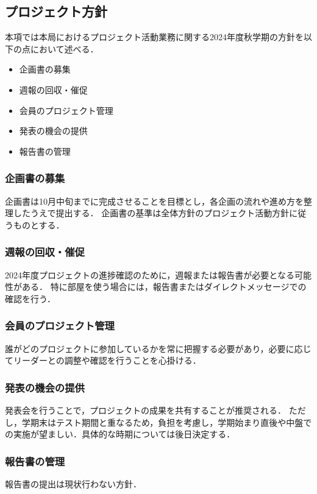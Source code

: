\subsection*{プロジェクト方針}


本項では本局におけるプロジェクト活動業務に関する2024年度秋学期の方針を以下の点において述べる．

\begin{itemize}
  \item 企画書の募集
  \item 週報の回収・催促
  \item 会員のプロジェクト管理
  \item 発表の機会の提供
  \item 報告書の管理
\end{itemize}

\subsubsection*{企画書の募集}

企画書は10月中旬までに完成させることを目標とし，各企画の流れや進め方を整理したうえで提出する．
企画書の基準は全体方針のプロジェクト活動方針に従うものとする．

\subsubsection*{週報の回収・催促}
2024年度プロジェクトの進捗確認のために，週報または報告書が必要となる可能性がある．
特に部屋を使う場合には，報告書またはダイレクトメッセージでの確認を行う．

\subsubsection*{会員のプロジェクト管理}

誰がどのプロジェクトに参加しているかを常に把握する必要があり，必要に応じてリーダーとの調整や確認を行うことを心掛ける．

\subsubsection*{発表の機会の提供}

発表会を行うことで，プロジェクトの成果を共有することが推奨される．
ただし，学期末はテスト期間と重なるため，負担を考慮し，学期始まり直後や中盤での実施が望ましい．具体的な時期については後日決定する．


\subsubsection*{報告書の管理}

報告書の提出は現状行わない方針．
